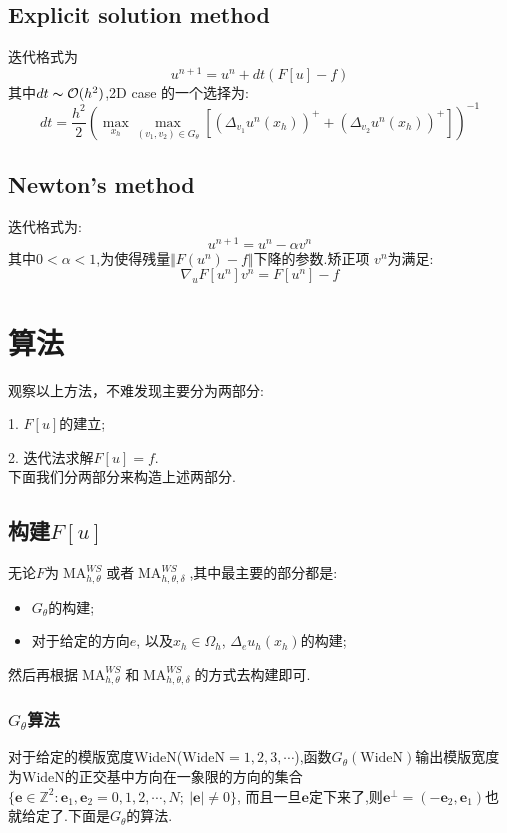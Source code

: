 \documentclass[11pt]{article}
\begin{document}
\subsection{Explicit solution method}
迭代格式为
$$u^{n+1}=u^n+dt(F[u]-f)$$
其中$dt\thicksim\mathcal{O}(h^2)$,2D case 的一个选择为:
$$d t=\frac{h^{2}}{2}\left(\max _{x_h}
\max _{\left(v_{1}, v_{2}\right) \in G_{\theta}} \left[\left(\Delta_{v_{1}} u^{n}\left(x_{h}\right)\right)^{+}+\left(\Delta_{v_{2}} u^{n}\left(x_{h}\right)\right)^{+}\right]\right)^{-1}$$

\subsection{Newton's method }
迭代格式为:
$$u^{n+1}=u^n-\alpha v^n$$
其中$0<\alpha<1$,为使得残量$\Vert{F(u^n)-f}\Vert$下降的参数.矫正项
$v^n$为满足:
$$\nabla{}_uF[u^n]v^n=F[u^n]-f$$

\section{算法}
观察以上方法，不难发现主要分为两部分:

1. $F[u]$的建立;

2. 迭代法求解$F[u]=f.$\\
下面我们分两部分来构造上述两部分.

\subsection{构建$F[u]$}
无论$F$为$\operatorname{MA}_{h,\theta}^{WS}$或者$\operatorname{MA}_{h,\theta,\delta}^{WS}$,其中最主要的部分都是:
\begin{itemize}
\item $G_\theta$的构建;
\item 对于给定的方向$e$, 以及$x_h\in \Omega_h$, $\Delta{}_eu_h(x_h)$的构建;
\end{itemize}
然后再根据$\operatorname{MA}_{h,\theta}^{WS}$和$\operatorname{MA}_{h,\theta,\delta}^{WS}$的方式去构建即可.
\subsubsection{$G_\theta$算法}
对于给定的模版宽度WideN($\text{WideN}=1,2,3,\cdots{}$),函数$G_\theta(\text{WideN})$输出模版宽度为WideN的正交基中方向在一象限的方向的集合$\{\bm{e}\in \mathbb{Z}^2:\bm{e}_1,\bm{e}_2=0,1,2,\cdots{},N;\ |\bm{e}|\neq0\}$, 而且一旦$\bm{e}$定下来了,则$\bm{e}^\perp=(-\bm{e}_2,\bm{e}_1)$也就给定了.下面是$G_\theta$的算法.
\end{document}

